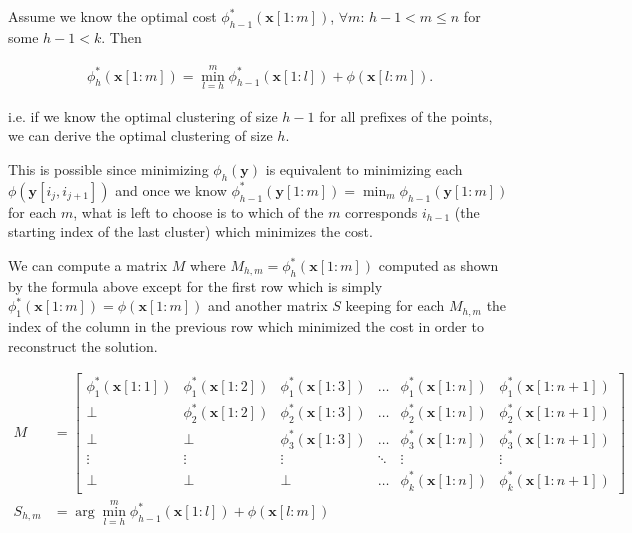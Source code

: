 \documentclass[a4paper]{article}
\begin{document}
\begin{enumerate}
    Assume we know the optimal cost
    $\phi_{h - 1}^*(\mathbf{x}[1:m])$, $\forall m$: $h - 1 < m \le n$ for some
    $h - 1 < k$. Then

    \begin{align*}
      \phi_{h}^*(\mathbf{x}[1:m]) = \min_{l = h}^m
      \phi_{h-1}^*(\mathbf{x}[1:l]) + \phi(\mathbf{x}[l:m]).
    \end{align*}
    
    i.e. if we know the optimal clustering of size $h-1$ for all
    prefixes of the points, we can derive the optimal clustering of size
    $h$.
    
    This is possible since minimizing $\phi_h(\mathbf{y})$ is equivalent to
    minimizing each $\phi(\mathbf{y}[i_{j}, i_{j + 1}])$ and once we know
    $\phi_{h-1}^*(\mathbf{y}[1:m]) = \min_m \phi_{h-1}(\mathbf{y}[1:m])$ for each $m$, what is left to choose is
    to which of the $m$ corresponds $i_{h-1}$ (the starting index of the
    last cluster) which minimizes the cost.

    We can compute a matrix $M$ where $M_{h,m} = \phi_h^*(\mathbf{x}[1:m])$
    computed as shown by the formula above except for the first row which is
    simply $\phi_1^*(\mathbf{x}[1:m]) = \phi(\mathbf{x}[1:m])$
    and another matrix $S$ keeping for
    each $M_{h,m}$ the index of the column in the previous row which minimized
    the cost in order to reconstruct the solution.

    \begin{align*}
      M &= 
      \begin{bmatrix}
        \phi_1^*(\mathbf{x}[1:1]) & \phi_1^*(\mathbf{x}[1:2]) &
        \phi_1^*(\mathbf{x}[1:3]) &\dots  & \phi_1^*(\mathbf{x}[1:n]) &
        \phi_1^*(\mathbf{x}[1:n + 1]) \\
        \bot & \phi_2^*(\mathbf{x}[1:2]) & \phi_2^*(\mathbf{x}[1:3]) & \dots &
        \phi_2^*(\mathbf{x}[1:n]) & \phi_2^*(\mathbf{x}[1:n + 1]) \\
        \bot & \bot & \phi_3^*(\mathbf{x}[1:3]) & \dots  &
        \phi_3^*(\mathbf{x}[1:n]) & \phi_3^*(\mathbf{x}[1:n + 1])\\
        \vdots & \vdots & \vdots & \ddots & \vdots & \vdots \\
        \bot & \bot & \bot & \dots  & \phi_k^*(\mathbf{x}[1:n]) &
        \phi_k^*(\mathbf{x}[1:n + 1])
      \end{bmatrix} \\
      S_{h,m} &= \arg \min_{l = h}^m
      \phi_{h-1}^*(\mathbf{x}[1:l]) + \phi(\mathbf{x}[l:m])
    \end{align*}
    

\end{enumerate}
\end{document}
